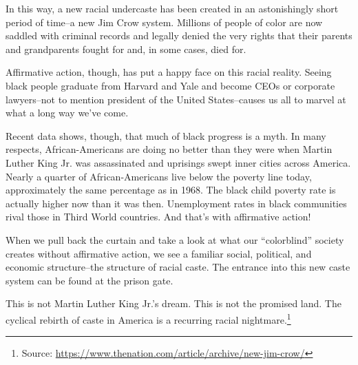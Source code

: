 \documentclass[10pt,a4paper]{article}
\newcommand{\source}[1]{\footnote{Source: \href{#1}{#1}}}
\begin{document}
In this way, a new racial undercaste has been created in an astonishingly short period of time–a new Jim Crow system. Millions of people of color are now saddled with criminal records and legally denied the very rights that their parents and grandparents fought for and, in some cases, died for.

Affirmative action, though, has put a happy face on this racial reality. Seeing black people graduate from Harvard and Yale and become CEOs or corporate lawyers–not to mention president of the United States–causes us all to marvel at what a long way we’ve come.

Recent data shows, though, that much of black progress is a myth. In many respects, African-Americans are doing no better than they were when Martin Luther King Jr. was assassinated and uprisings swept inner cities across America. Nearly a quarter of African-Americans live below the poverty line today, approximately the same percentage as in 1968. The black child poverty rate is actually higher now than it was then. Unemployment rates in black communities rival those in Third World countries. And that’s with affirmative action!

When we pull back the curtain and take a look at what our “colorblind” society creates without affirmative action, we see a familiar social, political, and economic structure–the structure of racial caste. The entrance into this new caste system can be found at the prison gate.

This is not Martin Luther King Jr.’s dream. This is not the promised land. The cyclical rebirth of caste in America is a recurring racial nightmare.\source{https://www.thenation.com/article/archive/new-jim-crow/}
\end{document}
